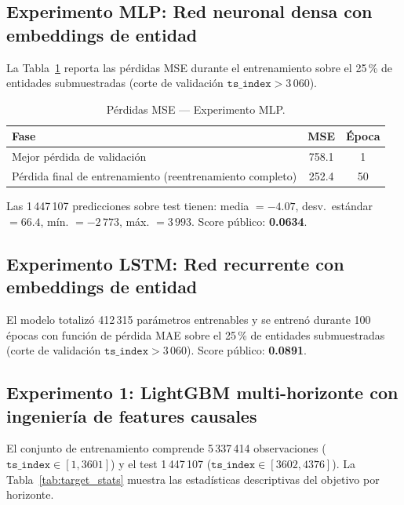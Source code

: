 \documentclass{article}
\begin{document}
\subsection{Experimento MLP: Red neuronal densa con embeddings de entidad}

La Tabla~\ref{tab:mlp_results} reporta las pérdidas MSE durante el entrenamiento sobre el 25\,\% de entidades submuestradas (corte de validación $\texttt{ts\_index} > 3\,060$).

\begin{table}[h!]
  \caption{Pérdidas MSE — Experimento MLP.}
  \label{tab:mlp_results}
  \centering
  \begin{tabular}{lcc}
    \toprule
    Fase & MSE & Época \\
    \midrule
    Mejor pérdida de validación & 758.1 & 1 \\
    Pérdida final de entrenamiento (reentrenamiento completo) & 252.4 & 50 \\
    \bottomrule
  \end{tabular}
\end{table}

Las 1\,447\,107 predicciones sobre test tienen: media $= -4.07$, desv.~estándar $= 66.4$, mín. $= -2\,773$, máx. $= 3\,993$. Score público: \textbf{0.0634}.

\subsection{Experimento LSTM: Red recurrente con embeddings de entidad}

El modelo totalizó 412\,315 parámetros entrenables y se entrenó durante 100 épocas con función de pérdida MAE sobre el 25\,\% de entidades submuestradas (corte de validación $\texttt{ts\_index} > 3\,060$). Score público: \textbf{0.0891}.

\subsection{Experimento 1: LightGBM multi-horizonte con ingeniería de features causales}

El conjunto de entrenamiento comprende 5\,337\,414 observaciones ($\texttt{ts\_index} \in [1, 3601]$) y el test 1\,447\,107 ($\texttt{ts\_index} \in [3602, 4376]$). La Tabla~\ref{tab:target_stats} muestra las estadísticas descriptivas del objetivo por horizonte.
\end{document}
